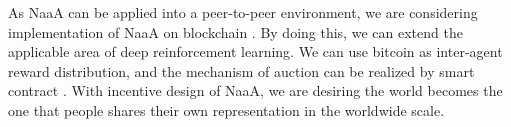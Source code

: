 As NaaA can be applied into a peer-to-peer environment, 
we are considering implementation of NaaA on blockchain \citep{swan2015blockchain}.
By doing this, we can extend the applicable area of deep reinforcement learning.
We can use bitcoin \citep{nakamoto2008bitcoin} as inter-agent reward distribution, and the mechanism of auction can be realized by smart contract \citep{buterin2014next}.
With incentive design of NaaA, we are desiring the world becomes the one that people shares their own representation in the worldwide scale.



